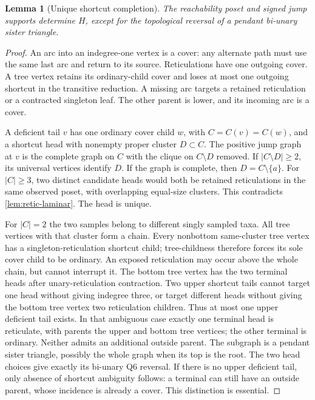 \documentclass[11pt]{article}
\newtheorem{lemma}[theorem]{Lemma}
\begin{document}
\begin{lemma}[Unique shortcut completion]
\label{lem:shortcuts}
The reachability poset and signed jump supports determine $H$, except for the topological reversal of a pendant bi-unary sister triangle.
\end{lemma}
\begin{proof}
An arc into an indegree-one vertex is a cover: any alternate path must use the same last arc and return to its source. Reticulations have one outgoing cover. A tree vertex retains its ordinary-child cover and loses at most one outgoing shortcut in the transitive reduction. A missing arc targets a retained reticulation or a contracted singleton leaf. The other parent is lower, and its incoming arc is a cover.

A deficient tail $v$ has one ordinary cover child $w$, with $C=C(v)=C(w)$, and a shortcut head with nonempty proper cluster $D\subset C$. The positive jump graph at $v$ is the complete graph on $C$ with the clique on $C\setminus D$ removed. If $|C\setminus D|\ge2$, its universal vertices identify $D$. If the graph is complete, then $D=C\setminus\{a\}$. For $|C|\ge3$, two distinct candidate heads would both be retained reticulations in the same observed poset, with overlapping equal-size clusters. This contradicts \cref{lem:retic-laminar}. The head is unique.

For $|C|=2$ the two samples belong to different singly sampled taxa. All tree vertices with that cluster form a chain. Every nonbottom same-cluster tree vertex has a singleton-reticulation shortcut child; tree-childness therefore forces its sole cover child to be ordinary. An exposed reticulation may occur above the whole chain, but cannot interrupt it. The bottom tree vertex has the two terminal heads after unary-reticulation contraction. Two upper shortcut tails cannot target one head without giving indegree three, or target different heads without giving the bottom tree vertex two reticulation children. Thus at most one upper deficient tail exists. In that ambiguous case exactly one terminal head is reticulate, with parents the upper and bottom tree vertices; the other terminal is ordinary. Neither admits an additional outside parent. The subgraph is a pendant sister triangle, possibly the whole graph when its top is the root. The two head choices give exactly its bi-unary Q6 reversal. If there is no upper deficient tail, only absence of shortcut ambiguity follows: a terminal can still have an outside parent, whose incidence is already a cover. This distinction is essential.
\end{proof}
\end{document}
